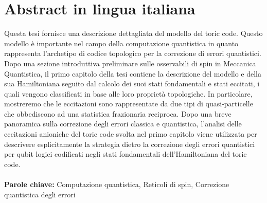 \documentclass{Configuration_Files/PoliMi3i_thesis}
\begin{document}
\chapter*{Abstract in lingua italiana}
Questa tesi fornisce una descrizione dettagliata del modello del toric code. Questo modello è importante nel campo della computazione quantistica in quanto rappresenta l'archetipo di codice topologico per la correzione di errori quantistici. Dopo una sezione introduttiva preliminare sulle osservabili di spin in Meccanica Quantistica, il primo capitolo della tesi contiene la descrizione del modello e della sua Hamiltoniana seguito dal calcolo dei suoi stati fondamentali e stati eccitati, i quali vengono classificati in base alle loro proprietà topologiche. In particolare, mostreremo che le eccitazioni sono rappresentate da due tipi di quasi-particelle che obbediscono ad una statistica frazionaria reciproca. Dopo una breve panoramica sulla correzione degli errori classica e quantistica, l'analisi delle eccitazioni anioniche del toric code svolta nel primo capitolo viene utilizzata per descrivere esplicitamente la strategia dietro la correzione degli errori quantistici per qubit logici codificati negli stati fondamentali dell'Hamiltoniana del toric code. 
\\
\\
\textbf{Parole chiave:} Computazione quantistica, Reticoli di spin, Correzione quantistica degli errori %


\thispagestyle{empty}
\tableofcontents %
\thispagestyle{empty}
\cleardoublepage

%
%
%    
%
\end{document}
